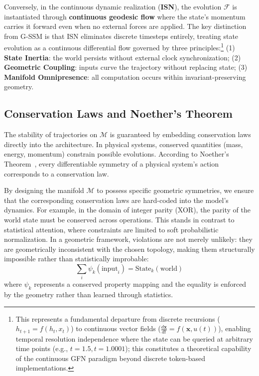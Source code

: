 \documentclass[12pt,a4paper]{article}
\begin{document}
Conversely, in the continuous dynamic realization (\textbf{ISN}), the evolution $\mathcal{F}$ is instantiated through \textbf{continuous geodesic flow} where the state's momentum carries it forward even when no external forces are applied. The key distinction from G-SSM is that ISN eliminates discrete timesteps entirely, treating state evolution as a continuous differential flow governed by three principles:\footnote{This represents a fundamental departure from discrete recursions ($h_{t+1} = f(h_t, x_t)$) to continuous vector fields ($\frac{d\mathbf{x}}{dt} = f(\mathbf{x}, u(t))$), enabling temporal resolution independence where the state can be queried at arbitrary time points (e.g., $t=1.5, t=1.0001$); this constitutes a theoretical capability of the continuous GFN paradigm beyond discrete token-based implementations.} (1) \textbf{State Inertia}: the world persists without external clock synchronization; (2) \textbf{Geometric Coupling}: inputs curve the trajectory without replacing state; (3) \textbf{Manifold Omnipresence}: all computation occurs within invariant-preserving geometry.

\subsection{Conservation Laws and Noether's Theorem}
\label{sec:conservation-laws}

The stability of trajectories on $\mathcal{M}$ is guaranteed by embedding conservation laws directly into the architecture. In physical systems, conserved quantities (mass, energy, momentum) constrain possible evolutions. According to Noether's Theorem~\cite{noether1918}, every differentiable symmetry of a physical system's action corresponds to a conservation law.

By designing the manifold $\mathcal{M}$ to possess specific geometric symmetries, we ensure that the corresponding conservation laws are hard-coded into the model's dynamics. For example, in the domain of integer parity (XOR), the parity of the world state must be conserved across operations. This stands in contrast to statistical attention, where constraints are limited to soft probabilistic normalization. In a geometric framework, violations are not merely unlikely: they are geometrically inconsistent with the chosen topology, making them structurally impossible rather than statistically improbable:
\begin{equation}
    \sum_{i} \psi_k(\text{input}_i) = \text{State}_k(\text{world})
    \label{eq:conservation}
\end{equation}
where $\psi_k$ represents a conserved property mapping and the equality is enforced by the geometry rather than learned through statistics.
\end{document}
